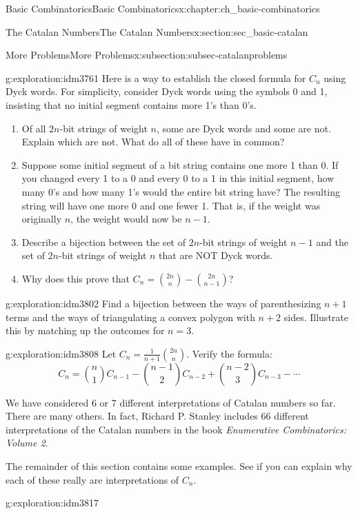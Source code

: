 \documentclass[oneside,10pt,]{book}
\numberwithin{equation}{chapter}
\begin{document}
\begin{chapterptx}{Basic Combinatorics}{}{Basic Combinatorics}{}{}{x:chapter:ch_basic-combinatorics}
\begin{sectionptx}{The Catalan Numbers}{}{The Catalan Numbers}{}{}{x:section:sec_basic-catalan}
\begin{subsectionptx}{More Problems}{}{More Problems}{}{}{x:subsection:subsec-catalanproblems}
\begin{exploration}{}{g:exploration:idm3761}
Here is a way to establish the closed formula for \(C_n\) using Dyck words.  For simplicity, consider Dyck words using the symbols 0 and 1, insisting that no initial segment contains more 1's than 0's.%
\begin{enumerate}[font=\bfseries,label=(\alph*),ref=\alph*]
\item{}Of all \(2n\)-bit strings of weight \(n\), some are Dyck words and some are not.  Explain which are not.  What do all of these have in common?%
\item{}Suppose some initial segment of a bit string contains one more 1 than 0.  If you changed every 1 to a 0 and every 0 to a 1 in this initial segment, how many 0's and how many 1's would the entire bit string have?%
The resulting string will have one more 0 and one fewer 1.  That is, if the weight was originally \(n\), the weight would now be \(n-1\).%
\item{}Describe a bijection between the set of \(2n\)-bit strings of weight \(n-1\) and the set of \(2n\)-bit strings of weight \(n\) that are NOT Dyck words.%
\item{}Why does this prove that \(C_n = \binom{2n}{n} - \binom{2n}{n-1}\)?%
\end{enumerate}
\end{exploration}
\begin{exploration}{}{g:exploration:idm3802}%
Find a bijection between the ways of parenthesizing \(n+1\) terms and the ways of triangulating a convex polygon with \(n+2\) sides.  Illustrate this by matching up the outcomes for \(n = 3\).%
\end{exploration}
\begin{exploration}{}{g:exploration:idm3808}%
Let \(C_{n} = \frac{1}{n + 1}\binom{2n}{n}\). Verify the formula:%
\begin{equation*}
C_{n} = \binom{n}{1} C_{n - 1} - \binom{n - 1}{2} C_{n - 2} + \binom{n - 2}{3} C_{n - 3} - \cdots
\end{equation*}
%
\end{exploration}
We have considered 6 or 7 different interpretations of Catalan numbers so far.  There are many others.  In fact, Richard P. Stanley includes 66 different interpretations of the Catalan numbers in the book \emph{Enumerative Combinatorics: Volume 2}.%
\par
The remainder of this section contains some examples.  See if you can explain why each of these really are interpretations of \(C_n\).%
\begin{exploration}{}{g:exploration:idm3817}%

\end{exploration}
\end{subsectionptx}
\end{sectionptx}
\end{chapterptx}
\end{document}
